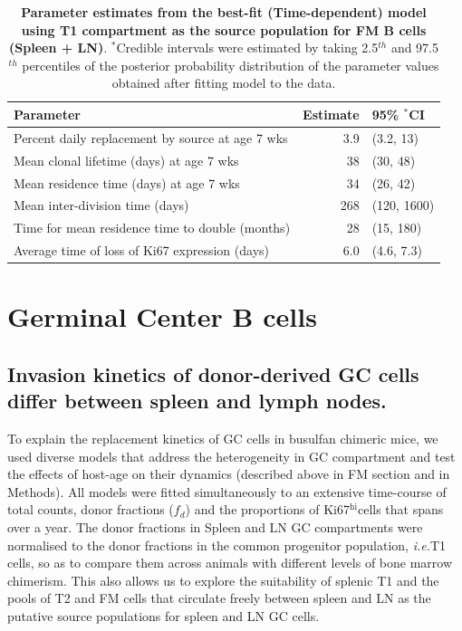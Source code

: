 \documentclass[11pt]{article}
\newcommand{\ie}{\textit{i.e.}}
\newcommand{\khi}{Ki67$^\text{hi}$}
\begin{document}
	
	\begin{table}[h!]
		\begin{center}
			\renewcommand{\arraystretch}{1.25}
			\begin{tabular}{ l r l } 
				\toprule 
				\textbf{Parameter}  &  {\small Estimate}  &  {\small 95\%  $^{\ast}$CI} \\ 
				\toprule
				Percent daily replacement by source at age 7 wks          & 3.9      &  (3.2, 13)  \\
				Mean clonal lifetime (days) at age 7 wks                  & 38       &  (30, 48)  \\
				Mean residence time (days) at age 7 wks                   & 34       &  (26, 42)  \\ 
				Mean inter-division time (days)                           & 268      &  (120, 1600)  \\
				Time for mean residence time to double (months)           & 28       &  (15, 180)  \\
				Average time of loss of Ki67 expression (days)            & 6.0      &  (4.6, 7.3)  \\
				\hline
				\toprule 
			\end{tabular}
		\end{center}
		\caption{\small \textbf{Parameter estimates from the best-fit (Time-dependent) model using T1 compartment as the source population for FM B cells (Spleen + LN)}. $^{\ast}$Credible intervals were estimated by taking 2.5$^{th}$ and 97.5$^{th}$ percentiles of the posterior probability distribution of the parameter values obtained after fitting model to the data.}
		\label{tab:FM-parestm}
	\end{table} 
	
	\clearpage
	
	\section*{Germinal Center B cells}
	
	\subsection*{Invasion kinetics of donor-derived GC cells differ between spleen and lymph nodes.}
	To explain the replacement  kinetics of GC cells in busulfan chimeric mice, we used diverse models that address the heterogeneity in GC compartment and test the effects of host-age on their dynamics (described above in FM section and in Methods).
	All models were fitted simultaneously to an extensive time-course of total counts, donor fractions ($f_{d}$) and the proportions of \khi cells that spans over a year.
	The donor fractions in Spleen and LN GC compartments were normalised to the donor fractions in the common progenitor population, \ie T1 cells, so as to compare them across animals with different levels of bone marrow chimerism.
	This also allows us to explore the suitability of splenic T1 and the pools of T2 and FM cells that circulate freely between spleen and LN as the putative source populations for spleen and LN GC cells. 
	
\end{document}
